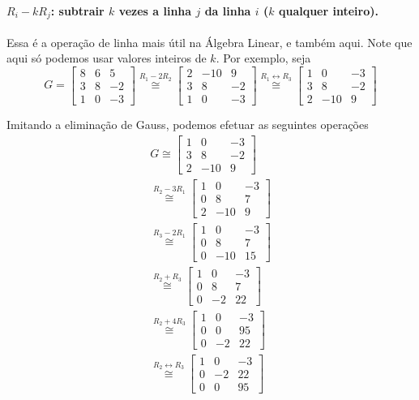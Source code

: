 \documentclass[a4paper,portuguese,11pt,twoside, leqno]{book}
\theoremstyle{definition}
\begin{document}
	\paragraph{$R_i - kR_j$: subtrair $k$ vezes a linha $j$ da linha $i$ ($k$ qualquer inteiro).} Essa é a operação de linha mais útil na Álgebra Linear, e também aqui. Note que aqui só podemos usar valores inteiros de $k$. Por exemplo, seja
	$$
	G = \begin{bmatrix}
	8 & 6 & 5 \\
	3 & 8 & -2 \\
	1 & 0 & -3
	\end{bmatrix} \stackrel{R_1 - 2R_2}{\cong} \begin{bmatrix}
	2 & -10 & 9 \\
	3 & 8 & -2 \\
	1 & 0 & -3
	\end{bmatrix} \stackrel{R_1\leftrightarrow R_3}{\cong} \begin{bmatrix}
	1 & 0 & -3 \\
	3 & 8 & -2 \\
	2 & -10 & 9
	\end{bmatrix}
	$$ 
	\par\vspace{0.3cm} Imitando a eliminação de Gauss, podemos efetuar as seguintes operações
	\begin{align*} 
	G \cong \begin{bmatrix}
	1 & 0 & -3 \\
	3 & 8 & -2 \\
	2 & -10 & 9
	\end{bmatrix} \\ \stackrel{R_2 - 3R_1}{\cong} \begin{bmatrix}
	1 & 0 & -3 \\
	0 & 8 & 7 \\
	2 & -10 & 9
	\end{bmatrix} \\ \stackrel{R_3 - 2R_1}{\cong} \begin{bmatrix}
	1 & 0 & -3 \\
	0 & 8 & 7 \\
	0 & -10 & 15
	\end{bmatrix} \\ \stackrel{R_2 + R_3}{\cong} \begin{bmatrix}
	1 & 0 & -3 \\
	0 & 8 & 7 \\
	0 & -2 & 22
	\end{bmatrix} \\ \stackrel{R_2 + 4R_3}{\cong} \begin{bmatrix}
	1 & 0 & -3 \\
	0 & 0 & 95 \\
	0 & -2 & 22
	\end{bmatrix} \\ \stackrel{R_2\leftrightarrow R_3}{\cong} \begin{bmatrix}
	1 & 0 & -3 \\
	0 & -2 & 22 \\
	0 & 0 & 95 
	\end{bmatrix}
	\end{align*} 
\end{document}
